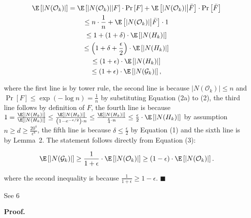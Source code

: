 \documentclass[10pt,a4paper]{article}
\begin{document}
\[\begin{gathered}
\displaystyle\E\left[|N(\mathcal{O}_{k})|\right] \displaystyle=\E\left[|N(\mathcal{O}_{k})|\middle|F\right]\cdot\Pr\left[F\right]+\E\left[|N(\mathcal{O}_{k})|\middle|\bar{F}\right]\cdot\Pr\left[\bar{F}\right] \\
\displaystyle\leq n\cdot\frac{1}{n}+\E\left[|N(\mathcal{O}_{k})|\middle|\bar{F}\right]\cdot 1 \\
\displaystyle\leq 1+(1+\delta)\cdot\E\left[|N(H_{k})|\right] \\
\displaystyle\leq\left(1+\delta+\frac{\epsilon}{2}\right)\cdot\E\left[|N(H_{k})|\right] \\
\displaystyle\leq\left(1+\epsilon\right)\cdot\E\left[|N(H_{k})|\right] \\
\displaystyle\leq\left(1+\epsilon\right)\cdot\E\left[|N(\mathcal{G}_{k})|\right],
\end{gathered}\]


where the first line is by tower rule, the second line is because $|N(\mathcal{O}_{k})|\leq n$ and $\Pr\left[F\right]\leq\exp\left(-\log{n}\right)=\frac{1}{n}$ by substituting Equation (2a) to (2), the third line follows by definition of $F$, the fourth line is because $1=\frac{\E\left[|N(H_{k})|\right]}{\E\left[|N(H_{k})|\right]}\leq\frac{\E\left[|N(H_{k})|\right]}{\left(1-e^{-\epsilon/2}\right)\cdot n}\leq\frac{\E\left[|N(H_{k})|\right]}{\frac{\epsilon}{4}\cdot n}\leq\frac{\epsilon}{2}\cdot\E\left[|N(H_{k})|\right]$ by assumption $n\geq d\geq\frac{20^{4}}{\epsilon^{8}}$, the fifth line is because $\delta\leq\frac{\epsilon}{2}$ by Equation (1) and the sixth line is by Lemma 2.
The statement follows directly from Equation (3):\par


\[\begin{gathered}
\displaystyle\E\left[|N(\mathcal{G}_{k})|\right]\geq\frac{1}{1+\epsilon}\cdot\E\left[|N(\mathcal{O}_{k})|\right]\geq\left(1-\epsilon\right)\cdot\E\left[|N(\mathcal{O}_{k})|\right].
\end{gathered}\]


where the second inequality is because $\frac{1}{1+\epsilon}\geq 1-\epsilon$.
\ensuremath{\blacksquare}\par





See 6\par




\par\medskip\noindent\textbf{Proof.}\par
\end{document}
